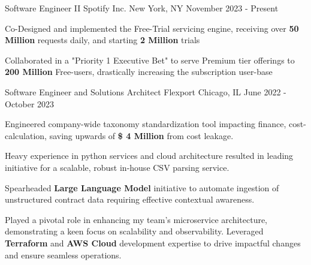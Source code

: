

\begin{cventries}

  \cventry
  {Software Engineer II} %
  {Spotify Inc.} %
  {New York, NY} %
  {November 2023 - Present} %
  {
    \begin{cvitems} %
      \item {Co-Designed and implemented the Free-Trial servicing engine, receiving over  \textbf{50 Million} requests daily, and starting  \textbf{2 Million} trials}
      \item {Collaborated in a "Priority 1 Executive Bet" to serve Premium tier offerings to  \textbf{200 Million} Free-users, drastically increasing the subscription user-base}
    \end{cvitems}
  }

\cventry
    {Software Engineer and Solutions Architect} %
    {Flexport} %
    {Chicago, IL} %
    {June 2022 - October 2023} %
    {
      \begin{cvitems} %
        \item {Engineered company-wide taxonomy standardization tool impacting finance, cost-calculation, saving upwards of \textbf{\$ 4 Million} from cost leakage.}
        \item {Heavy experience in python services and cloud architecture resulted in leading initiative for a scalable, robust in-house CSV parsing service.}
        \item{Spearheaded \textbf{Large Language Model} initiative to automate ingestion of unstructured contract data requiring effective contextual awareness.}
        \item{Played a pivotal role in enhancing my team's microservice architecture, demonstrating a keen focus on scalability and observability. Leveraged \textbf{Terraform} and \textbf{AWS Cloud} development expertise to drive impactful changes and ensure seamless operations.}
      \end{cvitems}
    }


\end{cventries}

